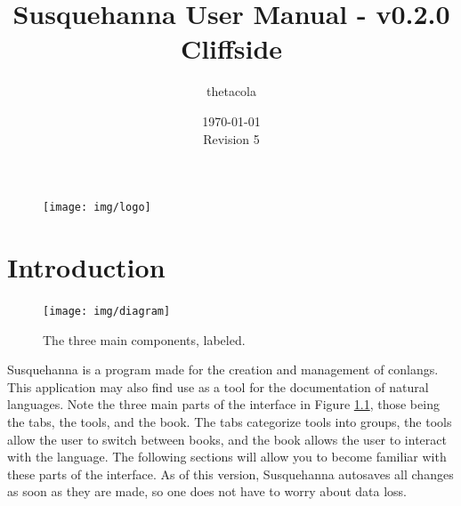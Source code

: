 \documentclass{report}
\title{Susquehanna User Manual - v0.2.0 Cliffside}
\date{\today\\Revision 5}
\author{thetacola}
\begin{document}
	\begin{figure}
		\centering
		\texttt{[image: img/logo]}
	\end{figure}
	\maketitle
	\tableofcontents
	\chapter{Introduction}
	\begin{figure}[ht]
		\centering
		\texttt{[image: img/diagram]}
		\caption{The three main components, labeled.}
		\label{fig:tabs-diagram-1}
	\end{figure}
	\par
	Susquehanna is a program made for the creation and management of conlangs. This application may also find use as a tool for the documentation of natural languages. Note the three main parts of the interface in Figure \ref{fig:tabs-diagram-1}, those being the tabs, the tools, and the book. The tabs categorize tools into groups, the tools allow the user to switch between books, and the book allows the user to interact with the language. The following sections will allow you to become familiar with these parts of the interface. As of this version, Susquehanna autosaves all changes as soon as they are made, so one does not have to worry about data loss.
\end{document}

